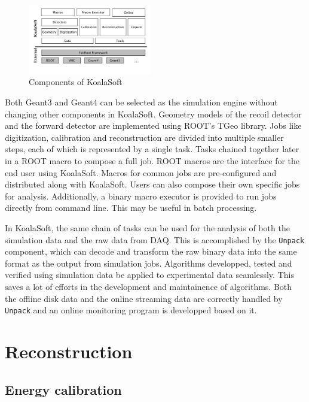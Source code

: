 \documentclass[number,5p]{elsarticle}
\begin{document}
\begin{figure}[htbp]
  \centering
  \includegraphics[width=0.48\textwidth]{./koalasoft_components.png}
  \caption{Components of KoalaSoft}
  \label{fig:koalasoft}
\end{figure}

Both Geant3 and Geant4 can be selected as the simulation engine without changing other components in KoalaSoft.
Geometry models of the recoil detector and the forward detector are implemented using ROOT's TGeo library.
Jobs like digitization, calibration and reconstruction are divided into multiple smaller steps, each of which is represented by a single task.
Tasks chained together later in a ROOT macro to compose a full job. 
ROOT macros are the interface for the end user using KoalaSoft.
Macros for common jobs are pre-configured and distributed along with KoalaSoft.
Users can also compose their own specific jobs for analysis.
Additionally, a binary macro executor is provided to run jobs directly from command line. This may be useful in batch processing.

In KoalaSoft, the same chain of tasks can be used for the analysis of both the simulation data and the raw data from DAQ.
This is accomplished by the \texttt{Unpack} component, which can decode and transform the raw binary data into the same format as the output from simulation jobs.
Algorithms developped, tested and verified using simulation data be applied to experimental data seamlessly.
This saves a lot of efforts in the development and maintainence of algorithms.
Both the offline disk data and the online streaming data are correctly handled by \texttt{Unpack} and an online monitoring program is developped based on it.

\section{Reconstruction}
\label{sec:reconstruction}

\subsection{Energy calibration}
\label{sec:calibration}
\end{document}
